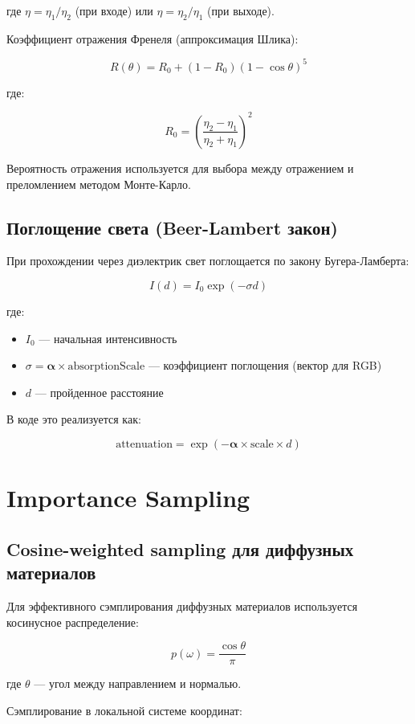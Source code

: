 \documentclass[14pt, a4paper]{extarticle}
\begin{document}
где $\eta = \eta_1 / \eta_2$ (при входе) или $\eta = \eta_2 / \eta_1$ (при выходе).

Коэффициент отражения Френеля (аппроксимация Шлика):

\[
R(\theta) = R_0 + (1 - R_0)(1 - \cos\theta)^5
\]

где:

\[
R_0 = \left(\frac{\eta_2 - \eta_1}{\eta_2 + \eta_1}\right)^2
\]

Вероятность отражения используется для выбора между отражением и преломлением методом Монте-Карло.

\subsection{Поглощение света (Beer-Lambert закон)}

При прохождении через диэлектрик свет поглощается по закону Бугера-Ламберта:

\[
I(d) = I_0 \exp(-\sigma d)
\]

где:
\begin{itemize}
    \item $I_0$ --- начальная интенсивность
    \item $\sigma = \boldsymbol{\alpha} \times \text{absorptionScale}$ --- коэффициент поглощения (вектор для RGB)
    \item $d$ --- пройденное расстояние
\end{itemize}

В коде это реализуется как:

\[
\text{attenuation} = \exp(-\boldsymbol{\alpha} \times \text{scale} \times d)
\]

\section{Importance Sampling}

\subsection{Cosine-weighted sampling для диффузных материалов}

Для эффективного сэмплирования диффузных материалов используется косинусное распределение:

\[
p(\omega) = \frac{\cos\theta}{\pi}
\]

где $\theta$ --- угол между направлением и нормалью.

Сэмплирование в локальной системе координат:
\end{document}
